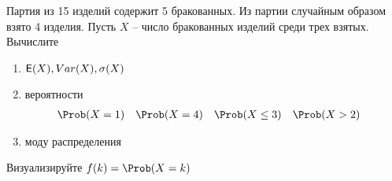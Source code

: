 \begin{exercise}
Партия из 15 изделий содержит 5 бракованных. Из партии случайным образом взято 4 изделия. 
Пусть \(X\) -- число бракованных изделий среди трех взятых.
Вычислите
\begin{enumerate}
	\item \({\mathsf E}(X), Var(X), \sigma(X)\)
	\item вероятности
	\begin{align*}
		&\Prob(X=1) & &\Prob(X=4) & &\Prob(X\leq3) & &\Prob(X>2)
	\end{align*}
	\item моду распределения
\end{enumerate}
Визуализируйте \(f(k)=\Prob(X=k)\)
\end{exercise}